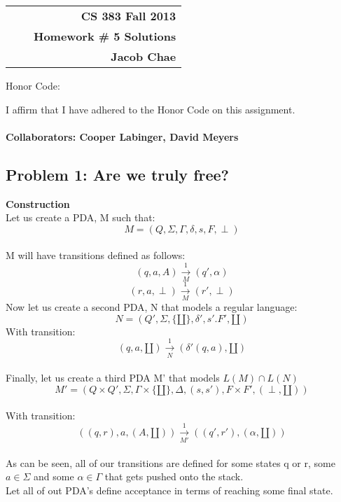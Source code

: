 \documentclass[11pt]{article}
\makeatletter
\renewcommand\maketitle{
\begin{center}
\begin{tabular*}{6.44in}{l @{\extracolsep{\fill}}c r}
\hline
\bfseries  &  & \bfseries CS 383 Fall 2013 \\
\bfseries&  & \bfseries  Homework \# 5 Solutions\\ %
\bfseries   &   &  \bfseries Jacob Chae\\ %
\hline
\end{tabular*}
\end{center} }
\makeatother
\begin{document}
\maketitle
\thispagestyle{plain}


\noindent Honor Code: 

\noindent I affirm that I have adhered to the Honor Code on this assignment.\\\\
\textbf{Collaborators: Cooper Labinger, David Meyers}

\subsection*{Problem 1: Are we truly free?}

\textbf{Construction }\\
Let us create a PDA, M such that: \\
$$M=(Q, \Sigma, \Gamma, \delta, s, F, \perp)$$\\
M will have transitions defined as follows:\\
$$(q, a, A) \xrightarrow[M]{1} (q', \alpha)$$
$$(r, a, \perp) \xrightarrow[M]{1} (r', \perp)$$
Now let us create a second PDA, N that models a regular language:\\
$$N = (Q', \Sigma, \{\amalg\}, \delta ', s'. F', \amalg)$$
With transition:\\
$$(q, a, \amalg) \xrightarrow[N]{1} (\delta '(q, a), \amalg)$$\\
Finally, let us create a third PDA M' that models $L(M) \cap L(N)$\\
$$M'=(Q \times Q', \Sigma, \Gamma \times \{\amalg\}, \Delta, (s, s'), F \times F', (\perp, \amalg))$$\\
With transition:
$$((q, r), a, (A, \amalg)) \xrightarrow[M']{1} ((q', r'), (\alpha, \amalg))$$\\
As can be seen, all of our transitions are defined for some states q or r, some $a \in \Sigma$ and some $\alpha \in \Gamma$ that gets pushed onto the stack. \\
Let all of out PDA's define acceptance in terms of reaching some final state.
\end{document}
